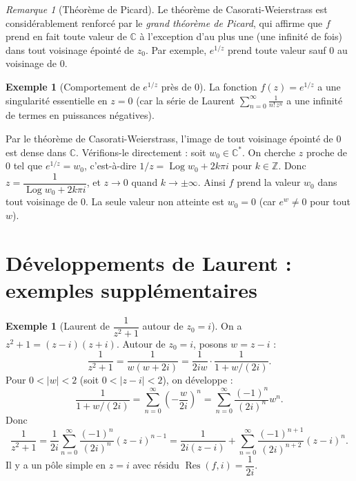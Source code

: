 \documentclass[12pt,a4paper,openany]{book}
\theoremstyle{definition}
\newtheorem{exemple}[definition]{Exemple}
\theoremstyle{plain}
\theoremstyle{remark}
\newtheorem{remarque}[definition]{Remarque}
\newcommand{\C}{\mathbb{C}}
\newcommand{\Z}{\mathbb{Z}}
\DeclareMathOperator{\Log}{Log}
\DeclareMathOperator{\Res}{Res}
\newcommand{\abs}[1]{\left|#1\right|}
\begin{document}
\begin{remarque}[Théorème de Picard]\label{rem:picard}
Le théorème de Casorati-Weierstrass est considérablement renforcé par
le \emph{grand théorème de Picard}, qui affirme que $f$ prend en fait
toute valeur de $\C$ à l'exception d'au plus une (une infinité de fois)
dans tout voisinage épointé de $z_0$. Par exemple, $e^{1/z}$ prend
toute valeur sauf $0$ au voisinage de $0$.
\end{remarque}

\begin{exemple}[Comportement de $e^{1/z}$ près de $0$]\label{ex:casorati-exp1/z}
La fonction $f(z) = e^{1/z}$ a une singularité essentielle en $z = 0$
(car la série de Laurent $\sum_{n=0}^\infty \frac{1}{n!\,z^n}$ a une
infinité de termes en puissances négatives).

Par le théorème de Casorati-Weierstrass, l'image de tout voisinage
épointé de $0$ est dense dans $\C$. Vérifions-le directement : soit
$w_0 \in \C^*$. On cherche $z$ proche de $0$ tel que $e^{1/z} = w_0$,
c'est-à-dire $1/z = \Log w_0 + 2k\pi i$ pour $k \in \Z$. Donc
$z = \dfrac{1}{\Log w_0 + 2k\pi i}$, et $z \to 0$ quand
$k \to \pm\infty$. Ainsi $f$ prend la valeur $w_0$ dans tout voisinage
de $0$. La seule valeur non atteinte est $w_0 = 0$ (car $e^w \neq 0$
pour tout $w$).
\end{exemple}

\section{Développements de Laurent : exemples supplémentaires}

\begin{exemple}[Laurent de $\dfrac{1}{z^2+1}$ autour de $z_0 = i$]\label{ex:laurent-1/(z2+1)}
On a $z^2+1 = (z-i)(z+i)$. Autour de $z_0 = i$, posons $w = z - i$ :
\[
  \frac{1}{z^2+1} = \frac{1}{w(w+2i)} = \frac{1}{2iw}\cdot\frac{1}{1+w/(2i)}.
\]
Pour $0 < \abs{w} < 2$ (soit $0 < \abs{z-i} < 2$), on développe :
\[
  \frac{1}{1+w/(2i)} = \sum_{n=0}^{\infty}\left(-\frac{w}{2i}\right)^n
  = \sum_{n=0}^{\infty}\frac{(-1)^n}{(2i)^n}w^n.
\]
Donc
\[
  \frac{1}{z^2+1} = \frac{1}{2i}\sum_{n=0}^{\infty}
  \frac{(-1)^n}{(2i)^n}(z-i)^{n-1}
  = \frac{1}{2i(z-i)} + \sum_{n=0}^{\infty}
  \frac{(-1)^{n+1}}{(2i)^{n+2}}(z-i)^n.
\]
Il y a un pôle simple en $z = i$ avec résidu $\Res(f, i) = \dfrac{1}{2i}$.
\end{exemple}
\end{document}
